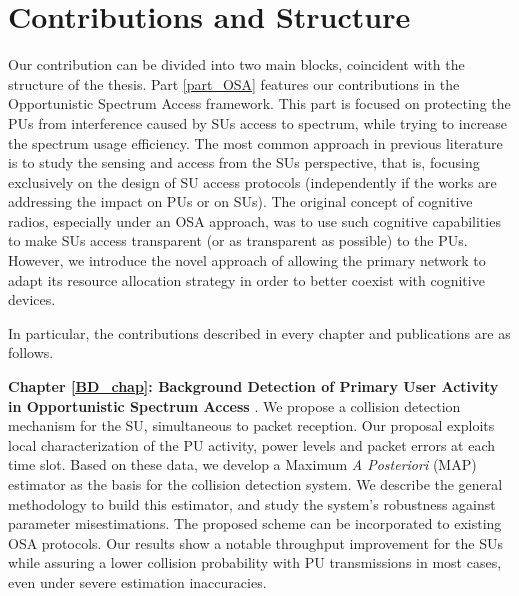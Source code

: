 \section{Contributions and Structure}

Our contribution can be divided into two main blocks, coincident with the structure of the thesis. 
Part \ref{part_OSA} features our contributions in the Opportunistic Spectrum Access framework.
This part is focused on protecting the PUs from interference caused by SUs access to spectrum, while trying to increase the spectrum usage efficiency. 
The most common approach in previous literature is to study the sensing and access from the SUs perspective, that is, focusing exclusively on the design of SU access protocols (independently if the works are addressing the impact on PUs or on SUs).
The original concept of cognitive radios, especially under an OSA approach, was to use such cognitive capabilities to make SUs access transparent (or as transparent as possible) to the PUs. 
However, we introduce the novel approach of allowing the primary network to adapt its resource allocation strategy in order to better coexist with cognitive devices. 

In particular, the contributions described in every chapter and publications are as follows.

\textbf{Chapter \ref{BD_chap}: Background Detection of Primary User Activity in Opportunistic Spectrum Access} \cite{ref:Alcaraz2015_BD}. 
We propose a collision detection mechanism for the SU, simultaneous to packet reception. 
Our proposal exploits local characterization of the PU activity, power levels and packet errors at each time slot. 
Based on these data, we develop a Maximum \textit{A Posteriori} (MAP) estimator as the basis for the collision detection system. We describe the general methodology to build this estimator, and study the system's robustness against parameter misestimations. 
The proposed scheme can be incorporated to existing OSA protocols. 
Our results show a notable throughput improvement for the SUs while assuring a lower collision probability with PU transmissions in most cases, even under severe estimation inaccuracies. 

